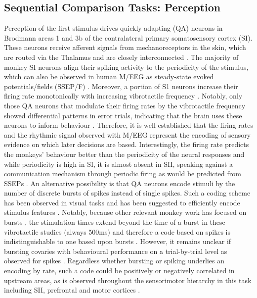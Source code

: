 \subsection{Sequential Comparison Tasks: Perception}
Perception of the first stimulus drives quickly adapting (QA) neurons in Brodmann areas 1 and 3b of the contralateral primary somatosensory cortex (SI). These neurons receive afferent signals from mechanoreceptors in the skin, which are routed via the Thalamus and are closely interconnected \parencite{Merzenich1969,Mountcastle1967,Talbot1968}. The majority of monkey SI neurons align their spiking activity to the periodicity of the stimulus, which can also be observed in human M/EEG as steady-state evoked potentials/fields (SSEP/F) \parencite{Mountcastle1990,Nangini2006,Tobimatsu1999}. Moreover, a portion of S1 neurons increase their firing rate monotonically with increasing vibrotactile frequency \parencite{Hernandez2010,Hernandez2000,Lemus2010,Luna2005,Salinas2000}. Notably, only those QA neurons that modulate their firing rates by the vibrotactile frequency showed differential patterns in error trials, indicating that the brain uses these neurons to inform behaviour \parencite{Salinas2000}. Therefore, it is well-established that the firing rates and the rhythmic signal observed with M/EEG represent the encoding of sensory evidence on which later decisions are based. Interestingly, the firing rate predicts the monkeys’ behaviour better than the periodicity of the neural responses and while periodicity is high in SI, it is almost absent in SII, speaking against a communication mechanism through periodic firing as would be predicted from SSEPs \parencite{Hernandez2000,Luna2005,Salinas2000}. An alternative possibility is that QA neurons encode stimuli by the number of discrete bursts of spikes instead of single spikes. Such a coding scheme has been observed in visual tasks and has been suggested to efficiently encode stimulus features  \parencite{Kepecs2003,Kepecs2002,Krahe2004,Reinagel1999,Romo2013}. Notably, because other relevant monkey work has focused on bursts \parencite[e.g.,][]{Lundqvist2016}, the stimulation times extend beyond the time of a burst in these vibrotactile studies (always 500ms) and therefore a code based on spikes is indistinguishable to one based upon bursts \parencite{Romo2013}. However, it remains unclear if bursting covaries with behavioural performance on a trial-by-trial level as observed for spikes \parencite{Luna2005}. Regardless whether bursting or spiking underlies an encoding by rate, such a code could be positively or negatively correlated in upstream areas, as is observed throughout the sensorimotor hierarchy in this task including SII, prefrontal and motor cortices \parencite{Hernandez2010,Salinas2000}.

